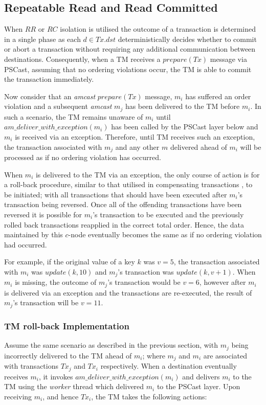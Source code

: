     \subsection{Repeatable Read and Read Committed} \label{ssec:rr_rc_recovery}
    When $RR$ or $RC$ isolation is utilised the outcome of a transaction is determined in a single phase as each $d \in Tx.dst$ deterministically decides whether to commit or abort a transaction without requiring any additional communication between destinations.  Consequently, when a TM receives a $prepare(Tx)$ message via \textsf{PSCast}, assuming that no ordering violations occur, the TM is able to commit the transaction immediately.  
    
    Now consider that an \emph{amcast} $prepare(Tx)$ message, $m_i$ has suffered an order violation and a subsequent \emph{amcast} $m_j$ has been delivered to the TM before $m_i$.  In such a scenario, the TM remains unaware of $m_i$ until $am\_deliver\_with\_exception(m_i)$ has been called by the \textsf{PSCast} layer below and $m_i$ is received via an exception.  Therefore, until TM receives such an exception, the transaction associated with $m_j$ and any other $m$ delivered ahead of $m_i$ will be processed as if no ordering violation has occurred.  
    
    When $m_i$ is delivered to the TM via an exception, the only course of action is for a roll-back procedure, similar to that utilised in compensating transactions \citep{Korth:1990:FAR:645916.671971}, to be initiated; with all transactions that should have been executed after $m_i$'s transaction being reversed.  Once all of the offending transactions have been reversed it is possible for $m_i$'s transaction to be executed and the previously rolled back transactions reapplied in the correct total order.  Hence, the data maintained by this $c$-node eventually becomes the same as if no ordering violation had occurred.  
    
    For example, if the original value of a key $k$ was $v=5$, the transaction associated with $m_i$ was $update(k, 10)$ and $m_j$'s transaction was $update(k, v+1)$.  When $m_i$ is missing, the outcome of $m_j$'s transaction would be $v = 6$, however after $m_i$ is delivered via an exception and the transactions are re-executed, the result of $m_j$'s transaction will be $v = 11$.  
    
    \subsubsection*{TM roll-back Implementation}
    Assume the same scenario as described in the previous section, with $m_j$ being incorrectly delivered to the TM ahead of $m_i$; where $m_j$ and $m_i$ are associated with transactions $Tx_j$ and $Tx_i$ respectively.  When a destination eventually receives $m_i$, it invokes $am\_deliver\_with\_exception(m_i)$ and delivers $m_i$ to the TM using the \emph{worker} thread which delivered $m_i$ to the \textsf{PSCast} layer.  Upon receiving $m_i$, and hence $Tx_i$, the TM takes the following actions:
    
